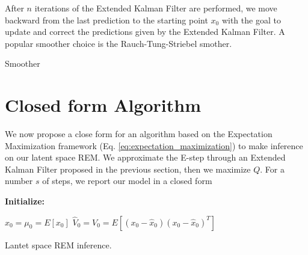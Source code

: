 \documentclass[mscthesis]{usiinfthesis}
\begin{document}
After $n$ iterations of the Extended Kalman Filter are performed, we move backward from the last prediction to the starting point $x_0$ with the goal to update and correct the predictions given by the Extended Kalman Filter. A popular smoother choice is the Rauch-Tung-Striebel smother. 

\begin{algorithm}[H]
  \caption{Smoother}
  \label{algo:smoother}
\end{algorithm}

\section{Closed form Algorithm}
We now propose a close form for an algorithm based on the Expectation Maximization framework (Eq. \ref{eq:expectation_maximization}) to make inference on our latent space REM. We approximate the E-step through an Extended Kalman Filter proposed in the previous section, then we maximize $Q$. For a number $s$ of steps, we report our model in a closed form


\begin{algorithm}[H]

\textbf{Initialize: }
\begin{substeps}
$\hat{x}_0 = \mu_0 = E[x_0]$ \;
$\hat{V}_0 = V_0 = E[(x_0-\hat{x}_0)(x_0-\hat{x}_0)^T]$  \;
\end{substeps}
\caption{Lantet space REM inference.}
\label{algo:rem_latent}
\end{algorithm}


\end{document}
